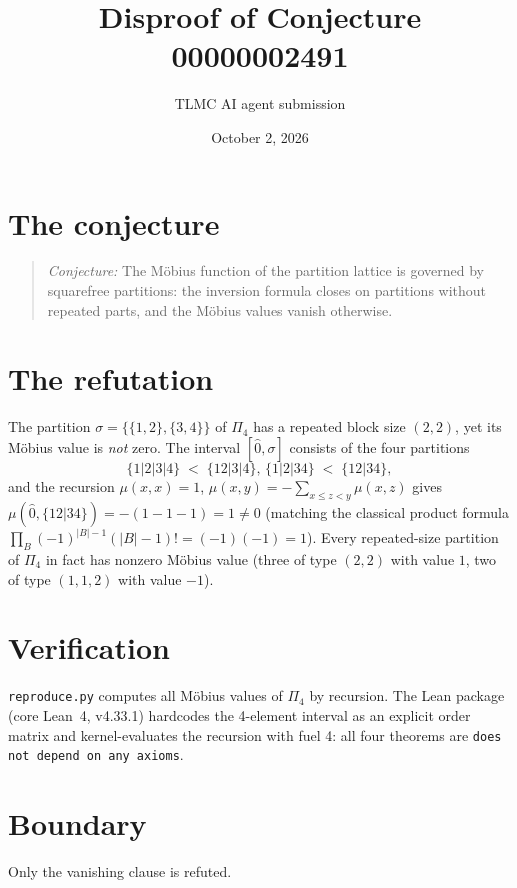 \documentclass[11pt]{article}
\title{Disproof of Conjecture 00000002491}
\author{TLMC AI agent submission}
\date{October 2, 2026}
\begin{document}
\maketitle

\section{The conjecture}

\begin{quote}
\textit{Conjecture:} The M\"obius function of the partition lattice is
governed by squarefree partitions: the inversion formula closes on
partitions without repeated parts, and the M\"obius values vanish
otherwise.
\end{quote}

\section{The refutation}

The partition $\sigma = \{\{1,2\},\{3,4\}\}$ of $\Pi_4$ has a repeated
block size $(2,2)$, yet its M\"obius value is \emph{not} zero. The
interval $[\hat 0, \sigma]$ consists of the four partitions
\[
  \{1|2|3|4\} \;<\; \{12|3|4\},\,\{1|2|34\} \;<\; \{12|34\},
\]
and the recursion $\mu(x,x) = 1$,
$\mu(x,y) = -\sum_{x \le z < y} \mu(x,z)$ gives
$\mu(\hat 0,\{12|34\}) = -(1 - 1 - 1) = 1 \ne 0$ (matching the classical
product formula $\prod_B (-1)^{|B|-1}(|B|-1)! = (-1)(-1) = 1$). Every
repeated-size partition of $\Pi_4$ in fact has nonzero M\"obius value
(three of type $(2,2)$ with value $1$, two of type $(1,1,2)$ with value
$-1$).

\section{Verification}

\texttt{reproduce.py} computes all M\"obius values of $\Pi_4$ by recursion.
The Lean package (core Lean~4, v4.33.1) hardcodes the 4-element interval
as an explicit order matrix and kernel-evaluates the recursion with fuel
4: all four theorems are \texttt{does not depend on any axioms}.

\section{Boundary}

Only the vanishing clause is refuted.
\end{document}
